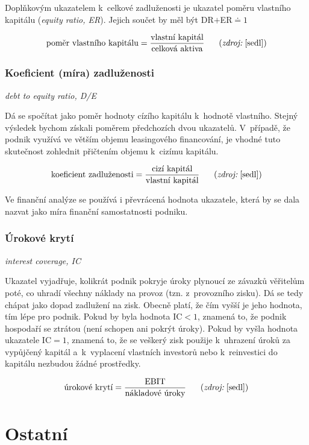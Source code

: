 \vspace{3mm}
Doplňkovým ukazatelem k~celkové zadluženosti je ukazatel poměru vlastního kapitálu (\textit{equity ratio, ER}). Jejich součet by měl být DR$+$ER$
\doteq 1$

$$\vz{poměr vlastního kapitálu}{vlastní kapitál}{celková aktiva} \scite{sedl}$$

\subsubsection{Koeficient (míra) zadluženosti}
\textit{debt to equity ratio, D/E}

Dá se spočítat jako poměr hodnoty cízího kapitálu k~hodnotě vlastního. Stejný výsledek bychom získali poměrem předchozích dvou ukazatelů. V~případě, že podnik využívá ve větším objemu leasingového financování, je vhodné tuto skutečnost zohlednit přičtením objemu k~cizímu kapitálu. 

$$\vz{koeficient zadluženosti}{cizí kapitál}{vlastní kapitál} \scite{sedl}$$

\vspace{3mm}
Ve finanční analýze se používá i převrácená hodnota ukazatele, která by se dala nazvat jako míra finanční samostatnosti podniku.

\subsubsection{Úrokové krytí}
\textit{interest coverage, IC}

Ukazatel vyjadřuje, kolikrát podnik pokryje úroky plynoucí ze závazků věřitelům poté, co uhradí všechny náklady na provoz (tzn. z~provozního zisku). Dá se tedy chápat jako dopad zadlužení na zisk. Obecně platí, že čím vyšší je jeho hodnota, tím lépe pro podnik. Pokud by byla hodnota IC$<1$, znamená to, že podnik hospodaří se ztrátou (není schopen ani pokrýt úroky). Pokud by vyšla hodnota ukazatele IC$=1$, znamená to, že se veškerý zisk použije k~uhrazení úroků za vypůjčený kapitál a~k~vyplacení vlastních investorů nebo k~reinvestici do kapitálu nezbudou žádné prostředky.

$$\vz{úrokové krytí}{EBIT}{nákladové úroky} \scite{sedl}$$








\section{Ostatní}

